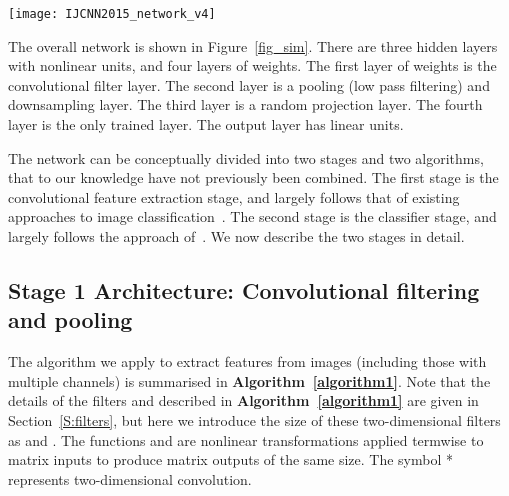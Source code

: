 \documentclass[conference]{IEEEtran}
\begin{document}
\begin{figure*}[!ht]
\centering
\texttt{[image: IJCNN2015\_network\_v4]}
 \caption{Overall network architecture. In total there are three hidden layers, plus an input layer and a linear output layer. There are two main stages: a convolutional filtering and pooling stage, and a classification stage. Only the final layer of weights,  is learnt, and this is achieved in a single batch using least squares regression. Of the remaining weights matrices,  is specified and remains fixed, e.g. taken from Overfeat~\cite{Sermanet.14_overfeat};  describes standard average pooling and downsampling; and  is set randomly or by using the method of~\cite{Zhu.15} that specifies the weights by sampling examples of the training distribution, as described in the text. Other variables shown are as follows:  is the number of pixels in an image,  is the number of features extracted per image,  is a downsampling factor,   is the number of hidden units in the classifier stage and  is the number of classes. }
\label{fig_sim}
\end{figure*}

The overall network is shown in Figure~\ref{fig_sim}. There are three hidden layers  with nonlinear units, and four layers of weights. The first layer of weights is the convolutional filter layer. The second layer is a pooling (low pass filtering) and downsampling layer. The third layer is a random projection layer. The fourth layer is the only trained layer. The output layer has linear units. 



The network can be conceptually divided into two stages and two algorithms, that to our knowledge have not previously been combined. The first stage is the convolutional feature extraction stage, and largely follows that of existing approaches to image classification~\cite{Coates.11,Coates.11a,Le.10,Sermanet.12}. The second stage is the classifier stage, and largely follows the approach of~\cite{Zhu.15,McDonnell.15PLOS}.  We now describe the two stages in detail.







\subsection{Stage 1 Architecture: Convolutional filtering and pooling}\label{S:Stage1}


The algorithm we apply to extract features from images (including those with multiple channels) is summarised in {\bf Algorithm~\ref{algorithm1}}. Note that the details of the filters  and  described in  {\bf Algorithm~\ref{algorithm1}} are given in Section~\ref{S:filters}, but here we introduce the size of these two-dimensional filters as  and . The functions  and  are nonlinear transformations applied termwise to matrix inputs to produce matrix outputs of the same size. The symbol * represents two-dimensional convolution.
\end{document}
